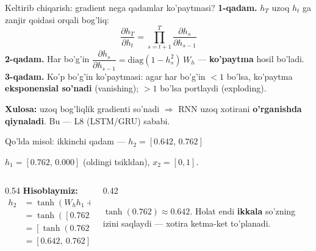 \documentclass[aspectratio=169,11pt]{beamer}
\begin{document}
\begin{frame}{Keltirib chiqarish: gradient nega qadamlar ko'paytmasi?}
  \textbf{1-qadam.} $h_T$ uzoq $h_{t}$ ga zanjir qoidasi orqali bog'liq:
  $$ \frac{\partial h_T}{\partial h_t} = \prod_{s=t+1}^{T} \frac{\partial h_s}{\partial h_{s-1}} $$
  \pause
  \textbf{2-qadam.} Har bo'g'in $\dfrac{\partial h_s}{\partial h_{s-1}}
  = \mathrm{diag}(1-h_s^2)\,W_h$ --- \textbf{ko'paytma} hosil bo'ladi.
  \pause
  \textbf{3-qadam.} Ko'p bo'g'in ko'paytmasi: agar har bo'g'in $<1$ bo'lsa, ko'paytma
  \textbf{eksponensial so'nadi} (vanishing); $>1$ bo'lsa portlaydi (exploding).
  \begin{tcolorbox}[okbox,top=2pt,bottom=2pt]
    \small \textbf{Xulosa:} uzoq bog'liqlik gradienti so'nadi $\Rightarrow$ RNN
    uzoq xotirani \textbf{o'rganishda qiynaladi}. Bu --- L8 (LSTM/GRU) sababi.
  \end{tcolorbox}
\end{frame}

\begin{frame}{Qo'lda misol: ikkinchi qadam --- $h_2=[0.642,\,0.762]$}
  \begin{tcolorbox}[defbox,title={Davomi: $h_1=[0.762,0]$,\ $x_2=[0,1]$,\ $W_h=W_x=I$}]
    \small $h_1=[0.762,\,0.000]$ (oldingi tsikldan), \; $x_2=[0,1]$.
  \end{tcolorbox}
  \vspace{0.2em}
  \begin{columns}[T]
    \begin{column}{0.54\textwidth}
      \textbf{Hisoblaymiz:}
      \begin{align*}
        h_2 &= \tanh(W_h h_1 + W_x x_2)\\
            &= \tanh([0.762,0] + [0,1])\\
            &= [\tanh(0.762),\ \tanh(1)]\\
            &= \mathbf{[0.642,\ 0.762]}
      \end{align*}
    \end{column}
    \begin{column}{0.42\textwidth}
      \begin{tcolorbox}[okbox,top=2pt,bottom=2pt]
        \footnotesize
        $\tanh(0.762)\approx 0.642$. Holat endi \textbf{ikkala} so'zning izini
        saqlaydi --- xotira ketma-ket to'planadi.
      \end{tcolorbox}
    \end{column}
  \end{columns}
\end{frame}
\end{document}
